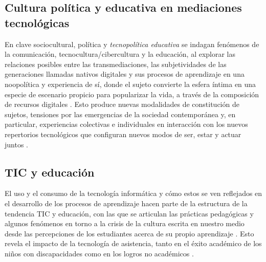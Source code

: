\documentclass[spanish]{textolivre}
\begin{document}
\subsection{Cultura política y educativa en mediaciones tecnológicas}\label{sec-cultura}
En clave sociocultural, política y \textit{tecnopolítica educativa} \cite{rueda_ortiz_tecnocultura_2004b} se indagan fenómenos de la comunicación, tecnocultura/cibercultura y la educación, al explorar las relaciones posibles entre las transmediaciones, las subjetividades de las generaciones llamadas nativos digitales \cite{chaparro-hurtado_consumo_2013} y sus procesos de aprendizaje \cite{amador_transmediaciones_2014, munoz_culturas_2010a} en una noopolítica y experiencia de sí, donde el sujeto convierte la esfera íntima en una especie de escenario propicio para popularizar la vida, a través de la composición de recursos digitales \cite{amador_infancias_2013}. Esto produce nuevas modalidades de constitución de sujetos, tensiones por las emergencias de la sociedad contemporánea y, en particular, experiencias colectivas e individuales en interacción con los nuevos repertorios tecnológicos que configuran nuevos modos de ser, estar y actuar juntos \cite{barrios_tao_subjetividades_2015, fonseca_rueda_2012, ramirez_cabanzo_infancias_2013, rueda_tecnocultura_2004a, rueda_ortiz_tecnocultura_2004b, rueda_cultura_2007}.

\subsection{TIC y educación}\label{sec-modelo}
El uso y el consumo de la tecnología informática y cómo estos se ven reflejados en el desarrollo de los procesos de aprendizaje hacen parte de la estructura de la tendencia TIC y educación, con las que se articulan las prácticas pedagógicas \cite{carvajal_tecnocultura_2013} y algunos fenómenos en torno a la crisis de la cultura escrita en nuestro medio \cite{carvajal_barrios_jovenes_2005} desde las percepciones de los estudiantes acerca de su propio aprendizaje \cite{bagdasarov_influence_2017}. Esto revela el impacto de la tecnología de asistencia, tanto en el éxito académico de los niños con discapacidades como en los logros no académicos \cite{harper_assistive_2017}.
\end{document}
